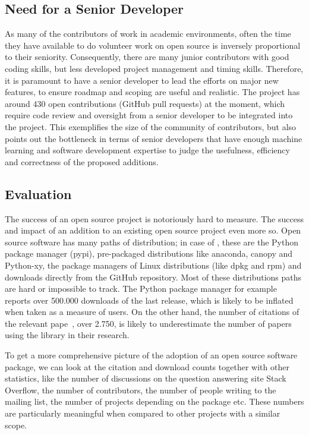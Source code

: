 \subsection{Need for a Senior Developer}
As many of the contributors of \sklearn{} work in academic environments,
often the time they have available to do volunteer work on open source is
inversely proportional to their seniority.
Consequently, there are many junior contributors with good coding skills,
but less developed project management and timing skills.
Therefore, it is paramount to have a senior developer to lead the efforts
on major new features, to ensure roadmap and scoping are useful and realistic.
The \sklearn{} project has around 430 open contributions (GitHub pull requests) at the moment,
which require code review and oversight from a senior developer to be integrated
into the project. This exemplifies the size of the community of contributors,
but also points out the bottleneck in terms of senior developers that
have enough machine learning and software development expertise to judge
the usefulness, efficiency and correctness of the proposed additions.


\subsection{Evaluation}
The success of an open source project is notoriously hard to measure. The
success and impact of an addition to an existing open source project even more
so. Open source software has many paths of distribution; in case of \sklearn{},
these are the Python package manager (pypi), pre-packaged distributions like
anaconda, canopy and Python-xy, the package managers of Linux distributions (like dpkg and rpm)
and downloads directly from the GitHub repository. Most of these distributions paths are hard
or impossible to track. The Python package manager for example reports over 500.000 downloads of the last
release, which is likely to be inflated when taken as a measure of users.
On the other hand, the number of citations of the relevant
pape~\autocite{pedregosa2011scikit}, over 2.750, is likely to underestimate
the number of papers using the \sklearn{} library in their research.

To get a more comprehensive picture of the adoption of an open source software
package, we can look at the citation and download counts together with other
statistics, like the number of discussions on the question answering site
Stack Overflow, the number of contributors, the number of people writing to the
mailing list, the number of projects depending on the package etc.  These
numbers are particularly meaningful when compared to other projects with a
similar scope.


